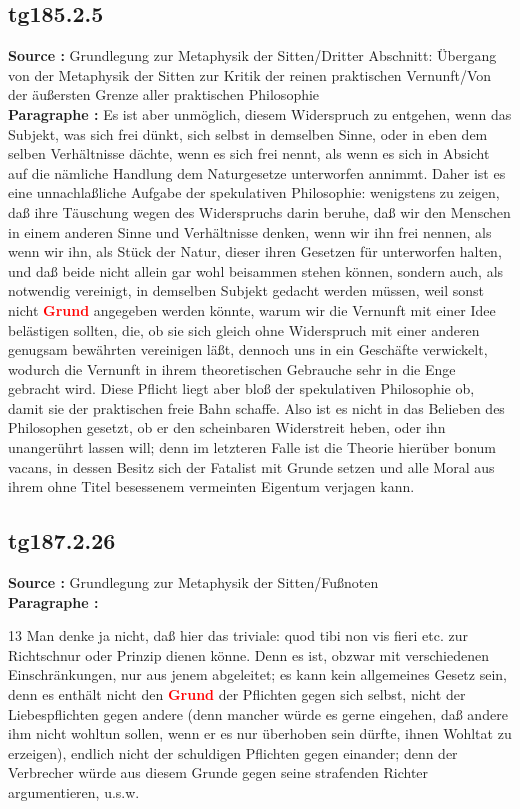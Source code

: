 \documentclass[a4paper,12pt,twoside]{book}
\newcommand{\match}[1]{\textcolor{red}{\textbf{#1}}}
\begin{document}
	\subsection*{tg185.2.5} 
	\textbf{Source : }Grundlegung zur Metaphysik der Sitten/Dritter Abschnitt: Übergang von der Metaphysik der Sitten zur Kritik der reinen praktischen Vernunft/Von der äußersten Grenze aller praktischen Philosophie\\  
	
	\noindent\textbf{Paragraphe : }Es ist aber unmöglich, diesem Widerspruch zu entgehen, wenn das Subjekt, was sich frei dünkt, sich selbst in demselben Sinne, oder in eben dem selben Verhältnisse dächte, wenn es sich frei nennt, als wenn es sich in Absicht auf die nämliche Handlung dem Naturgesetze unterworfen annimmt. Daher ist es eine unnachlaßliche Aufgabe der spekulativen Philosophie: wenigstens zu zeigen, daß ihre Täuschung wegen des Widerspruchs darin beruhe, daß wir den Menschen in einem anderen Sinne und Verhältnisse denken, wenn wir ihn frei nennen, als wenn wir ihn, als Stück der Natur, dieser ihren Gesetzen für unterworfen halten, und daß beide nicht allein gar wohl beisammen stehen können, sondern auch, als notwendig vereinigt, in demselben Subjekt gedacht werden müssen, weil sonst nicht \match{Grund} angegeben werden könnte, warum wir die Vernunft mit einer Idee belästigen sollten, die, ob sie sich gleich ohne Widerspruch mit einer anderen genugsam bewährten vereinigen läßt, dennoch uns in ein Geschäfte verwickelt, wodurch die Vernunft in ihrem theoretischen Gebrauche sehr in die Enge gebracht wird. Diese Pflicht liegt aber bloß der spekulativen Philosophie ob, damit sie der praktischen freie Bahn schaffe. Also ist es nicht in das Belieben des Philosophen gesetzt, ob er den scheinbaren Widerstreit heben, oder ihn unangerührt lassen will; denn im letzteren Falle ist die Theorie hierüber bonum vacans, in dessen Besitz sich der Fatalist mit Grunde setzen und alle Moral aus ihrem ohne Titel besessenem vermeinten Eigentum verjagen kann. 
	
	\subsection*{tg187.2.26} 
	\textbf{Source : }Grundlegung zur Metaphysik der Sitten/Fußnoten\\  
	
	\noindent\textbf{Paragraphe : }
	
	13 Man denke ja nicht, daß hier das triviale: quod tibi non vis fieri etc. zur Richtschnur oder Prinzip dienen könne. Denn es ist, obzwar mit verschiedenen Einschränkungen, nur aus jenem abgeleitet; es kann kein allgemeines Gesetz sein, denn es enthält nicht den \match{Grund} der Pflichten gegen sich selbst, nicht der Liebespflichten gegen andere (denn mancher würde es gerne eingehen, daß andere ihm nicht wohltun sollen, wenn er es nur überhoben sein dürfte, ihnen Wohltat zu erzeigen), endlich nicht der schuldigen Pflichten gegen einander; denn der Verbrecher würde aus diesem Grunde gegen seine strafenden Richter argumentieren, u.s.w. 
	
\end{document}
